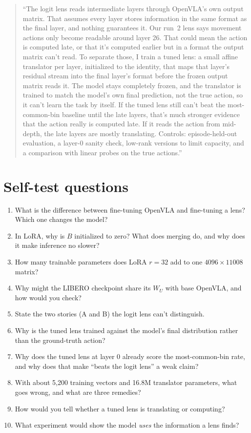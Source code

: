 \documentclass[11pt]{article}
\begin{document}
\begin{quote}
``The logit lens reads intermediate layers through OpenVLA's own output matrix. That assumes every layer stores information in the same format as the final layer, and nothing guarantees it. Our run~2 lens says movement actions only become readable around layer 26. That could mean the action is computed late, or that it's computed earlier but in a format the output matrix can't read. To separate those, I train a tuned lens: a small affine translator per layer, initialized to the identity, that maps that layer's residual stream into the final layer's format before the frozen output matrix reads it. The model stays completely frozen, and the translator is trained to match the model's own final prediction, not the true action, so it can't learn the task by itself. If the tuned lens still can't beat the most-common-bin baseline until the late layers, that's much stronger evidence that the action really is computed late. If it reads the action from mid-depth, the late layers are mostly translating. Controls: episode-held-out evaluation, a layer-0 sanity check, low-rank versions to limit capacity, and a comparison with linear probes on the true actions.''
\end{quote}

\section{Self-test questions}

\begin{enumerate}
  \item What is the difference between fine-tuning OpenVLA and fine-tuning a lens? Which one changes the model?
  \item In LoRA, why is $B$ initialized to zero? What does merging do, and why does it make inference no slower?
  \item How many trainable parameters does LoRA $r=32$ add to one $4096\times11008$ matrix?
  \item Why might the LIBERO checkpoint share its $W_U$ with base OpenVLA, and how would you check?
  \item State the two stories (A and B) the logit lens can't distinguish.
  \item Why is the tuned lens trained against the model's final distribution rather than the ground-truth action?
  \item Why does the tuned lens at layer 0 already score the most-common-bin rate, and why does that make ``beats the logit lens'' a weak claim?
  \item With about 5{,}200 training vectors and 16.8M translator parameters, what goes wrong, and what are three remedies?
  \item How would you tell whether a tuned lens is translating or computing?
  \item What experiment would show the model \emph{uses} the information a lens finds?
\end{enumerate}
\end{document}
